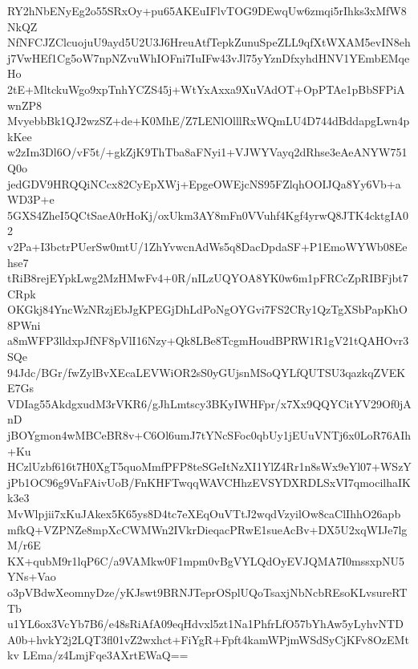 RY2hNbENyEg2o55SRxOy+pu65AKEuIFlvTOG9DEwqUw6zmqi5rIhks3xMfW8NkQZ
NfNFCJZClcuojuU9ayd5U2U3J6HreuAtfTepkZunuSpeZLL9qfXtWXAM5evIN8eh
j7VwHEf1Cg5oW7npNZvuWhIOFni7IuIFw43vJl75yYznDfxyhdHNV1YEmbEMqeHo
2tE+MltckuWgo9xpTnhYCZS45j+WtYxAxxa9XuVAdOT+OpPTAe1pBbSFPiAwnZP8
MvyebbBk1QJ2wzSZ+de+K0MhE/Z7LENlOlllRxWQmLU4D744dBddapgLwn4pkKee
w2zIm3Dl6O/vF5t/+gkZjK9ThTba8aFNyi1+VJWYVayq2dRhse3eAeANYW751Q0o
jedGDV9HRQQiNCcx82CyEpXWj+EpgeOWEjcNS95FZlqhOOIJQa8Yy6Vb+aWD3P+e
5GXS4ZheI5QCtSaeA0rHoKj/oxUkm3AY8mFn0VVuhf4Kgf4yrwQ8JTK4cktgIA02
v2Pa+I3bctrPUerSw0mtU/1ZhYvwcnAdWs5q8DacDpdaSF+P1EmoWYWb08Eehse7
tRiB8rejEYpkLwg2MzHMwFv4+0R/nILzUQYOA8YK0w6m1pFRCcZpRIBFjbt7CRpk
OKGkj84YncWzNRzjEbJgKPEGjDhLdPoNgOYGvi7FS2CRy1QzTgXSbPapKhO8PWni
a8mWFP3lldxpJfNF8pVlI16Nzy+Qk8LBe8TcgmHoudBPRW1R1gV21tQAHOvr3SQe
94Jdc/BGr/fwZylBvXEcaLEVWiOR2sS0yGUjsnMSoQYLfQUTSU3qazkqZVEKE7Gs
VDIag55AkdgxudM3rVKR6/gJhLmtscy3BKyIWHFpr/x7Xx9QQYCitYV29Of0jAnD
jBOYgmon4wMBCeBR8v+C6Ol6umJ7tYNcSFoc0qbUy1jEUuVNTj6x0LoR76AIh+Ku
HCzlUzbf616t7H0XgT5quoMmfPFP8teSGeItNzXI1YlZ4Rr1n8sWx9eYl07+WSzY
jPb1OC96g9VnFAivUoB/FnKHFTwqqWAVCHhzEVSYDXRDLSxVI7qmocilhaIKk3e3
MvWlpjii7xKuJAkex5K65ys8D4tc7eXEqOuVTtJ2wqdVzyilOw8caClIhhO26apb
mfkQ+VZPNZe8mpXcCWMWn2IVkrDieqacPRwE1sueAcBv+DX5U2xqWIJe7lgM/r6E
KX+qubM9r1lqP6C/a9VAMkw0F1mpm0vBgVYLQdOyEVJQMA7I0mssxpNU5YNs+Vao
o3pVBdwXeomnyDze/yKJswt9BRNJTeprOSplUQoTsaxjNbNcbREsoKLvsureRTTb
u1YL6ox3VcYb7B6/e48sRiAfA09eqHdvxl5zt1Na1PhfrLfO57bYhAw5yLyhvNTD
A0b+hvkY2j2LQT3fl01vZ2wxhct+FiYgR+Fpft4kamWPjmWSdSyCjKFv8OzEMtkv
LEma/z4LmjFqe3AXrtEWaQ==
